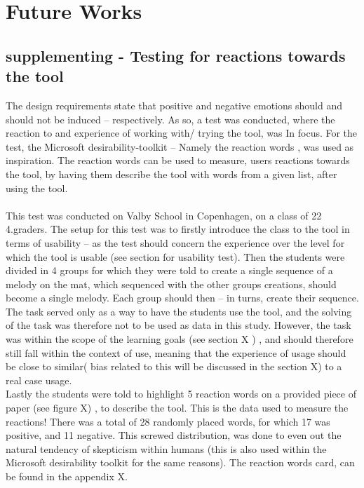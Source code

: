 \chapter{Future Works}
\section{supplementing - Testing for reactions towards the tool}
The design requirements state that positive and negative emotions should and should not be induced – respectively. As so, a test was conducted, where the reaction to and experience of working with/ trying the tool, was In focus. For the test, the Microsoft desirability-toolkit – Namely the reaction words \cite{reactionWords}, was used as inspiration. The reaction words can be used to measure, users reactions towards the tool, by having them describe the tool with words from a given list, after using the tool.\\\\
This test was conducted on Valby School in Copenhagen, on a class of 22 4.graders. The setup for this test was to firstly introduce the class to the tool in terms of usability – as the test should concern the experience over the level for which the tool is usable (see section for usability test). Then the students were divided in 4 groups for which they were told to create a single sequence of a melody on the mat, which sequenced with the other groups creations, should become a single melody. Each group should then – in turns, create their sequence. The task served only as a way to have the students use the tool, and the solving of the task was therefore not to be used as data in this study. However, the task was within the scope of the learning goals (see section X ) , and should therefore still fall within the context of use, meaning that the experience of usage should be close to similar( bias related to this will be discussed in the section X) to a real case usage.    
\newline
\\
Lastly the students were told to highlight 5 reaction words on a provided piece of paper (see figure X) , to describe the tool. This is the data used to measure the reactions! There was a total of 28 randomly placed words, for which 17 was positive, and 11 negative. This screwed distribution, was done to even out the natural tendency of skepticism within humans (this is also used within the Microsoft desirability toolkit for the same reasons).  The reaction words card, can be found in the appendix X. 
